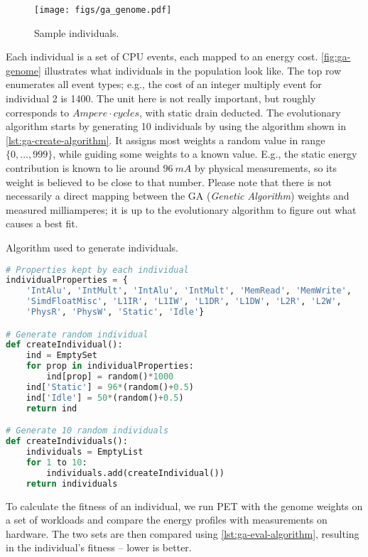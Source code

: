 \begin{figure}[hbt]
    \centering
    \def\svgwidth{\columnwidth}
    \texttt{[image: figs/ga\_genome.pdf]}
    \caption{Sample individuals.}
    \label{fig:ga-genome}
\end{figure}

Each individual is a set of CPU events, each mapped to an energy cost.
\autoref{fig:ga-genome} illustrates what individuals in the population look
like. The top row enumerates all event types; e.g., the cost of an integer
multiply event for individual 2 is 1400. The unit here is not really important,
but roughly corresponds to $Ampere \cdot cycles$, with static drain deducted.
The evolutionary algorithm starts by generating 10 individuals by using the
algorithm shown in \autoref{lst:ga-create-algorithm}. It assigns most weights a
random value in range $\{0, \ldots, 999\}$, while guiding some weights to a
known value. E.g., the static energy contribution is known to lie around $96~mA$
by physical measurements, so its weight is believed to be close to that number.
Please note that there is not necessarily a direct mapping between the GA
(\emph{Genetic Algorithm}) weights and measured milliamperes; it is up to the
evolutionary algorithm to figure out what causes a best fit.

\begin{algorithm}
\caption{Algorithm used to generate individuals.}
\label{lst:ga-create-algorithm}
\begin{lstlisting}[language=python,style=algo]
# Properties kept by each individual
individualProperties = {
    'IntAlu', 'IntMult', 'IntAlu', 'IntMult', 'MemRead', 'MemWrite',
    'SimdFloatMisc', 'L1IR', 'L1IW', 'L1DR', 'L1DW', 'L2R', 'L2W',
    'PhysR', 'PhysW', 'Static', 'Idle'}

# Generate random individual
def createIndividual():
    ind = EmptySet
    for prop in individualProperties:
        ind[prop] = random()*1000
    ind['Static'] = 96*(random()+0.5)
    ind['Idle'] = 50*(random()+0.5)
    return ind

# Generate 10 random individuals
def createIndividuals():
    individuals = EmptyList
    for 1 to 10:
        individuals.add(createIndividual())
    return individuals
\end{lstlisting}
\end{algorithm}

To calculate the fitness of an individual, we run PET with the genome weights on
a set of workloads and compare the energy profiles with measurements on
hardware. The two sets are then compared using \autoref{lst:ga-eval-algorithm},
resulting in the individual's fitness -- lower is better.

